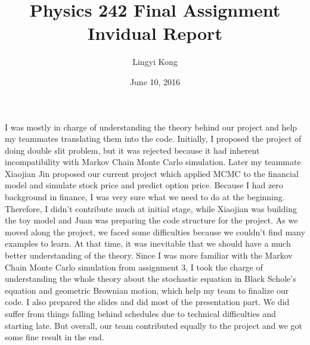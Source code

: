 \documentclass{article}
\title{Physics 242 Final Assignment\\Invidual Report}
\author{Lingyi Kong}
\date{June 10, 2016}
\begin{document}
\maketitle

I was mostly in charge of understanding the theory behind our project and help my teammates translating them into the code.
Initially, I proposed the project of doing double slit problem, but it was rejected because it had inherent incompatibility with Markov Chain Monte Carlo simulation. Later my teammate Xiaojian Jin proposed our current project which applied MCMC to the financial model and simulate stock price and predict option price. Because I had zero background in finance, I was very sure what we need to do at the beginning. Therefore, I didn't contribute much at initial stage, while Xiaojian was building the toy model and Juan was preparing the code structure for the project. As we moved along the project, we faced some difficulties because we couldn't find many examples to learn. At that time, it was inevitable that we should have a much better understanding of the theory. Since I was more familiar with the Markov Chain Monte Carlo simulation from assignment 3, I took the charge of understanding the whole theory about the stochastic equation in Black Schole's equation and geometric Brownian motion, which help my team to finalize our code. I also prepared the slides and did most of the presentation part.
We did suffer from things falling behind schedules due to technical difficulties and starting late. But overall, our team contributed equally to the project and we got some fine result in the end.
\end{document}
